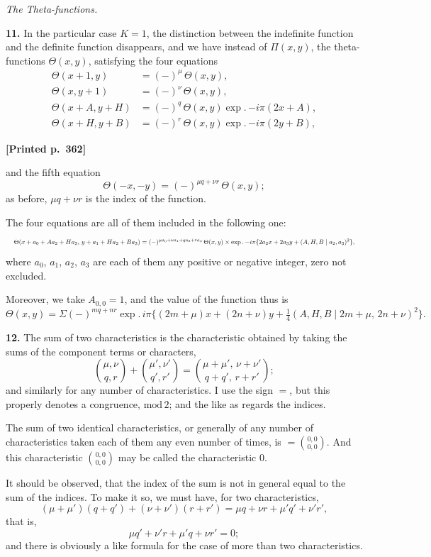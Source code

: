 \documentclass[11pt]{article}
\providecommand{\modd}{\mathrm{mod}}
\begin{document}
\medskip
\begin{center}\textit{The Theta-functions.}\end{center}

\noindent\textbf{11.} In the particular case $K=1$, the distinction between the indefinite function and the definite function disappears, and we have instead of $\Pi(x,y)$, the theta-functions $\Theta(x,y)$, satisfying the four equations
\begin{align*}
\Theta(x+1,y) &= (-)^{\mu}\,\Theta(x,y),\\
\Theta(x,y+1) &= (-)^{\nu}\,\Theta(x,y),\\
\Theta(x+A,y+H) &= (-)^{q}\,\Theta(x,y)\exp.\,{-i\pi}(2x+A),\\
\Theta(x+H,y+B) &= (-)^{r}\,\Theta(x,y)\exp.\,{-i\pi}(2y+B),
\end{align*}

\medskip
\noindent\textbf{[Printed p.~362]}\hfill

and the fifth equation
\[
\Theta(-x,-y) = (-)^{\mu q+\nu r}\,\Theta(x,y);
\]
as before, $\mu q+\nu r$ is the index of the function.

The four equations are all of them included in the following one:
\[
\resizebox{\textwidth}{!}{$\displaystyle
\Theta(x+a_{0}+Aa_{2}+Ha_{3},\,y+a_{1}+Ha_{2}+Ba_{3})=(-)^{\mu a_{0}+\nu a_{1}+q a_{2}+r a_{3}}\,\Theta(x,y)\times\exp.\,{-i\pi}\{2a_{2}x+2a_{3}y+(A,H,B \mid a_{2},a_{3})^{2}\},
$}
\]
where $a_{0}$, $a_{1}$, $a_{2}$, $a_{3}$ are each of them any positive or negative integer, zero not excluded.

Moreover, we take $A_{0,0}=1$, and the value of the function thus is
\[
\Theta(x,y) = \Sigma(-)^{mq+nr}\exp.\,i\pi\{(2m+\mu)x+(2n+\nu)y+\tfrac{1}{4}(A,H,B \mid 2m+\mu,\,2n+\nu)^{2}\}.
\]

\medskip
\noindent\textbf{12.} The sum of two characteristics is the characteristic obtained by taking the sums of the component terms or characters,
\[
\binom{\mu,\nu}{q,r}+\binom{\mu',\nu'}{q',r'}=\binom{\mu+\mu',\,\nu+\nu'}{q+q',\,r+r'};
\]
and similarly for any number of characteristics. I use the sign $=$, but this properly denotes a congruence, $\modd\,2$; and the like as regards the indices.

The sum of two identical characteristics, or generally of any number of characteristics taken each of them any even number of times, is $=\binom{0,0}{0,0}$. And this characteristic $\binom{0,0}{0,0}$ may be called the characteristic 0.

It should be observed, that the index of the sum is not in general equal to the sum of the indices. To make it so, we must have, for two characteristics,
\[
(\mu+\mu')(q+q')+(\nu+\nu')(r+r')=\mu q+\nu r+\mu' q'+\nu' r',
\]
that is,
\[
\mu q'+\nu' r+\mu' q+\nu r'=0;
\]
and there is obviously a like formula for the case of more than two characteristics.
\end{document}

